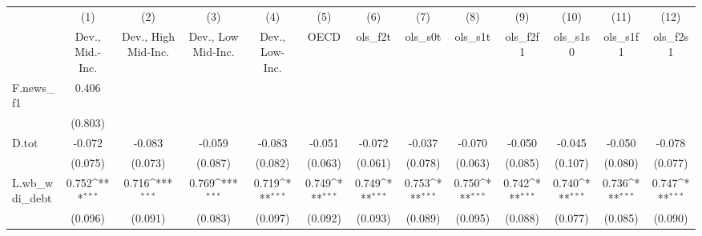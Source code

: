 {
\def\sym#1{\ifmmode^{#1}\else\(^{#1}\)\fi}
\begin{tabular}{l*{12}{c}}
\toprule
            &\multicolumn{1}{c}{(1)}&\multicolumn{1}{c}{(2)}&\multicolumn{1}{c}{(3)}&\multicolumn{1}{c}{(4)}&\multicolumn{1}{c}{(5)}&\multicolumn{1}{c}{(6)}&\multicolumn{1}{c}{(7)}&\multicolumn{1}{c}{(8)}&\multicolumn{1}{c}{(9)}&\multicolumn{1}{c}{(10)}&\multicolumn{1}{c}{(11)}&\multicolumn{1}{c}{(12)}\\
            &\multicolumn{1}{c}{Dev., Mid.-Inc.}&\multicolumn{1}{c}{Dev., High Mid-Inc.}&\multicolumn{1}{c}{Dev., Low Mid-Inc.}&\multicolumn{1}{c}{Dev., Low-Inc.}&\multicolumn{1}{c}{OECD}&\multicolumn{1}{c}{ols\_f2t}&\multicolumn{1}{c}{ols\_s0t}&\multicolumn{1}{c}{ols\_s1t}&\multicolumn{1}{c}{ols\_f2f1}&\multicolumn{1}{c}{ols\_s1s0}&\multicolumn{1}{c}{ols\_s1f1}&\multicolumn{1}{c}{ols\_f2s1}\\
\midrule
F.news\_f1   &       0.406         &                     &                     &                     &                     &                     &                     &                     &                     &                     &                     &                     \\
            &     (0.803)         &                     &                     &                     &                     &                     &                     &                     &                     &                     &                     &                     \\
\addlinespace
D.tot       &      -0.072         &      -0.083         &      -0.059         &      -0.083         &      -0.051         &      -0.072         &      -0.037         &      -0.070         &      -0.050         &      -0.045         &      -0.050         &      -0.078         \\
            &     (0.075)         &     (0.073)         &     (0.087)         &     (0.082)         &     (0.063)         &     (0.061)         &     (0.078)         &     (0.063)         &     (0.085)         &     (0.107)         &     (0.080)         &     (0.077)         \\
\addlinespace
L.wb\_wdi\_debt&       0.752\sym{***}&       0.716\sym{***}&       0.769\sym{***}&       0.719\sym{***}&       0.749\sym{***}&       0.749\sym{***}&       0.753\sym{***}&       0.750\sym{***}&       0.742\sym{***}&       0.740\sym{***}&       0.736\sym{***}&       0.747\sym{***}\\
            &     (0.096)         &     (0.091)         &     (0.083)         &     (0.097)         &     (0.092)         &     (0.093)         &     (0.089)         &     (0.095)         &     (0.088)         &     (0.077)         &     (0.085)         &     (0.090)         \\

\end{tabular}}
